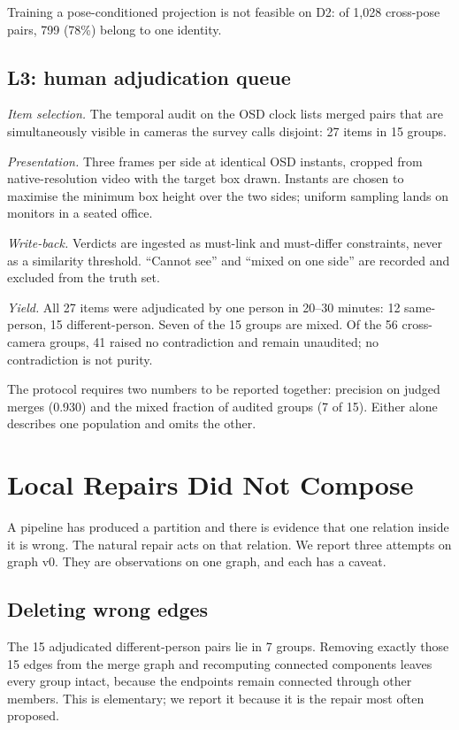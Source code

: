 \documentclass[journal]{IEEEtran}
\begin{document}
Training a pose-conditioned projection is not feasible on D2: of 1,028 cross-pose pairs, 799 (78\%) belong to one identity.

\subsection{L3: human adjudication queue}\label{sec:l3}
\emph{Item selection.} The temporal audit on the OSD clock lists merged pairs that are simultaneously visible in cameras the survey calls disjoint: 27 items in 15 groups.

\emph{Presentation.} Three frames per side at identical OSD instants, cropped from native-resolution video with the target box drawn. Instants are chosen to maximise the minimum box height over the two sides; uniform sampling lands on monitors in a seated office.

\emph{Write-back.} Verdicts are ingested as must-link and must-differ constraints, never as a similarity threshold. ``Cannot see'' and ``mixed on one side'' are recorded and excluded from the truth set.

\emph{Yield.} All 27 items were adjudicated by one person in 20--30 minutes: 12 same-person, 15 different-person. Seven of the 15 groups are mixed. Of the 56 cross-camera groups, 41 raised no contradiction and remain unaudited; no contradiction is not purity.

The protocol requires two numbers to be reported together: precision on judged merges (0.930) and the mixed fraction of audited groups (7 of 15). Either alone describes one population and omits the other.

\section{Local Repairs Did Not Compose}\label{sec:noncomp}
A pipeline has produced a partition and there is evidence that one relation inside it is wrong. The natural repair acts on that relation. We report three attempts on graph v0. They are observations on one graph, and each has a caveat.

\subsection{Deleting wrong edges}
The 15 adjudicated different-person pairs lie in 7 groups. Removing exactly those 15 edges from the merge graph and recomputing connected components leaves every group intact, because the endpoints remain connected through other members. This is elementary; we report it because it is the repair most often proposed.
\end{document}
